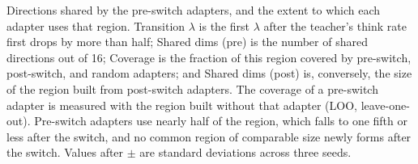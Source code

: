 \begin{table}[t]
\centering
\small

\caption{Directions shared by the pre-switch adapters, and the extent to which each adapter uses that region. Transition $\lambda$ is the first $\lambda$ after the teacher's think rate first drops by more than half; Shared dims (pre) is the number of shared directions out of 16; Coverage is the fraction of this region covered by pre-switch, post-switch, and random adapters; and Shared dims (post) is, conversely, the size of the region built from post-switch adapters. The coverage of a pre-switch adapter is measured with the region built without that adapter (LOO, leave-one-out). Pre-switch adapters use nearly half of the region, which falls to one fifth or less after the switch, and no common region of comparable size newly forms after the switch. Values after $\pm$ are standard deviations across three seeds.}
\label{tab:5}
\end{table}
